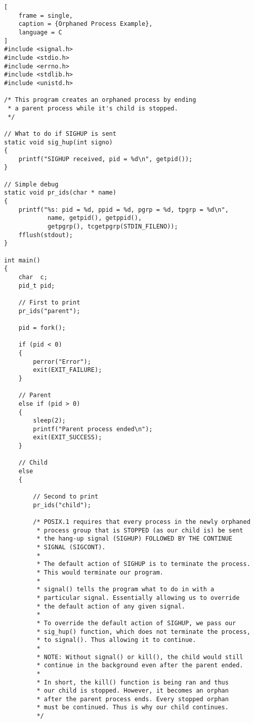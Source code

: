\documentclass{article}
\begin{document}
\begin{lstlisting}[
    frame = single,
    caption = {Orphaned Process Example},
    language = C
]
#include <signal.h>
#include <stdio.h>
#include <errno.h>
#include <stdlib.h>
#include <unistd.h>

/* This program creates an orphaned process by ending 
 * a parent process while it's child is stopped.
 */

// What to do if SIGHUP is sent
static void sig_hup(int signo)
{
    printf("SIGHUP received, pid = %d\n", getpid());
}

// Simple debug
static void pr_ids(char * name)
{
    printf("%s: pid = %d, ppid = %d, pgrp = %d, tpgrp = %d\n",
            name, getpid(), getppid(), 
            getpgrp(), tcgetpgrp(STDIN_FILENO));
    fflush(stdout);
}

int main()
{
    char  c;
    pid_t pid;

    // First to print
    pr_ids("parent");

    pid = fork();

    if (pid < 0)
    {
        perror("Error");
        exit(EXIT_FAILURE);
    }

    // Parent
    else if (pid > 0) 
    {
        sleep(2);
        printf("Parent process ended\n");
        exit(EXIT_SUCCESS);
    }

    // Child 
    else 
    {

        // Second to print
        pr_ids("child");

        /* POSIX.1 requires that every process in the newly orphaned
         * process group that is STOPPED (as our child is) be sent 
         * the hang-up signal (SIGHUP) FOLLOWED BY THE CONTINUE
         * SIGNAL (SIGCONT).
         *
         * The default action of SIGHUP is to terminate the process.
         * This would terminate our program.
         *
         * signal() tells the program what to do in with a 
         * particular signal. Essentially allowing us to override 
         * the default action of any given signal.
         *
         * To override the default action of SIGHUP, we pass our 
         * sig_hup() function, which does not terminate the process, 
         * to signal(). Thus allowing it to continue.
         * 
         * NOTE: Without signal() or kill(), the child would still 
         * continue in the background even after the parent ended.
         *
         * In short, the kill() function is being ran and thus
         * our child is stopped. However, it becomes an orphan
         * after the parent process ends. Every stopped orphan 
         * must be continued. Thus is why our child continues.
         */


\end{lstlisting}
\end{document}
